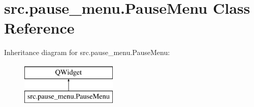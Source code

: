\hypertarget{classsrc_1_1pause__menu_1_1_pause_menu}{}\section{src.\+pause\+\_\+menu.\+Pause\+Menu Class Reference}
\label{classsrc_1_1pause__menu_1_1_pause_menu}
Inheritance diagram for src.\+pause\+\_\+menu.\+Pause\+Menu\+:\begin{figure}[H]
\begin{center}
\leavevmode
\includegraphics[height=2.000000cm]{classsrc_1_1pause__menu_1_1_pause_menu}
\end{center}
\end{figure}
